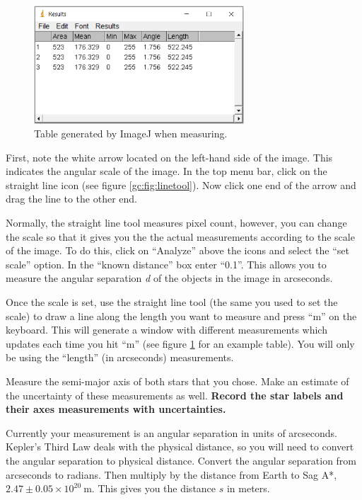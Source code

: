 \begin{figure}
	\centering
	\includegraphics[width=0.7\textwidth]{galactic-center/measurement_table.png}
	\caption {Table generated by ImageJ when measuring.}
	\label{gc:fig:measurement}
\end{figure}

\begin{steps}
	\item First, note the white arrow located on the left-hand side of the image. This indicates the angular scale of the image. In the top menu bar, click on the straight line icon (see  figure \ref{gc:fig:linetool}). Now click one end of the arrow and drag the line to the other end.
	
	\item Normally, the straight line tool measures pixel count, however, you can change the scale so that it gives you the the actual measurements according to the scale of the image. To do this, click on ``Analyze'' above the icons and select the ``set scale'' option. In the ``known distance'' box enter ``0.1''. This allows you to measure the angular separation \textit{d} of the objects in the image in arcseconds. 
	
	\item Once the scale is set, use the straight line tool (the same you used to set the scale) to draw a line along the length you want to measure and press ``m'' on the keyboard. This will generate a window with different measurements which updates each time you hit ``m'' (see figure \ref{gc:fig:measurement} for an example table). You will only be using the ``length'' (in arcseconds) measurements.%
	
	\item Measure the semi-major axis of both stars that you chose. Make an estimate of the uncertainty of these measurements as well. \textbf{Record the star labels and their axes measurements with uncertainties.}
	
	\item Currently your measurement is an angular separation in units of arcseconds. Kepler's Third Law deals with the physical distance, so you will need to convert the angular separation to physical distance. Convert the angular separation from arcseconds to radians. Then multiply by the distance from Earth to Sag A*, $2.47 \pm 0.05 \times 10^{20}\:$m. This gives you the distance $s$ in meters.
	

\end{steps}
